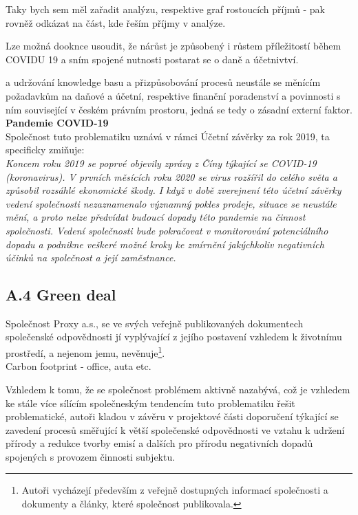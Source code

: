 Taky bych sem měl zařadit analýzu, respektive graf rostoucích příjmů - pak rovněž odkázat na část, kde řeším příjmy v analýze.

Lze možná dooknce usoudit, že nárůst je způsobený i růstem příležitostí během COVIDU 19 a sním spojené nutnosti postarat se o daně a účetnivtví.


 a udržování knowledge basu a přizpůsobování procesů neustále se měnícím požadavkům na daňové a účetní, respektive finanční poradenství a povinnosti s ním související v českém právním prostoru, jedná se tedy o zásadní externí faktor.\\
 
\textbf{Pandemie COVID-19}\\

Společnost tuto problematiku uznává v rámci Účetní závěrky za rok 2019, ta specificky zmiňuje:\\

\textit{Koncem roku 2019 se poprvé objevily zprávy z Číny týkající se COVID-19 (koronavirus). V prvních měsících roku 2020 se virus rozšířil do celého světa a způsobil rozsáhlé ekonomické škody. I když v době zverejnení této účetní závěrky vedení společnosti nezaznamenalo významný pokles prodeje, situace se neustále mění, a proto nelze předvídat budoucí dopady této pandemie na činnost společnosti. Vedení společnosti bude pokračovat v monitorování potenciálního dopadu a podnikne veškeré možné kroky ke zmírnění jakýchkoliv negativních účinků na společnost a její zaměstnance.}

\subsection*{A.4 Green deal}
\label{sec:Green deal}

Společnost Proxy a.s., se ve svých veřejně publikovaných dokumentech společenské odpovědnosti jí vyplývající z jejího postavení vzhledem k životnímu prostředí, a nejenom jemu, nevěnuje\footnote{Autoři vycházejí především z veřejně dostupných informací společnosti a dokumenty a články, které společnost publikovala.}.\\

Carbon footprint - office, auta etc.

Vzhledem k tomu, že se společnost problémem aktivně nazabývá, což je vzhledem ke stále více sílícím společneským tendencím tuto problematiku řešit problematické, autoři kladou v závěru v projektové části doporučení týkající se zavedení procesů směřující k větší společenské odpovědnosti ve vztahu k udržení přírody a redukce tvorby emisí a dalších pro přírodu negativních dopadů spojených s provozem činnosti subjektu.\\

